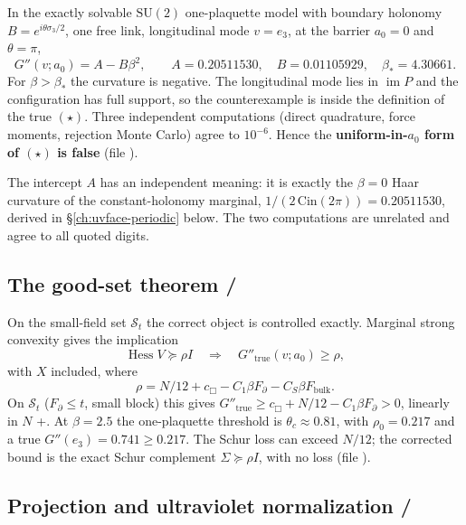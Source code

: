 In the exactly solvable $\mathrm{SU}(2)$ one-plaquette model with boundary holonomy
$B=e^{i\theta\sigma_3/2}$, one free link, longitudinal mode $v=e_3$, at the barrier $a_0=0$ and
$\theta=\pi$,
\begin{equation}
  G''(v;a_0)=A-B\beta^2,\qquad A=0.20511530,\quad B=0.01105929,\quad \beta_*=4.30661 .
  \label{eq:v3counter}
\end{equation}
For $\beta>\beta_*$ the curvature is negative. The longitudinal mode lies in $\operatorname{im}P$ and
the configuration has full support, so the counterexample is inside the definition of the true
$(\star)$. Three independent computations (direct quadrature, force moments, rejection Monte Carlo)
agree to $10^{-6}$. Hence the \textbf{uniform-in-$a_0$ form of $(\star)$ is false} \LN{} (file
).

The intercept $A$ has an independent meaning: it is exactly the $\beta=0$ Haar curvature of the
constant-holonomy marginal, $1/(2\,\mathrm{Cin}(2\pi))=0.20511530$, derived in
\S\ref{ch:uvface-periodic} below. The two computations are unrelated and agree to all quoted digits.

\subsection{The good-set theorem \LT/\LC}

On the small-field set $\mathcal S_t$ the correct object is controlled exactly. Marginal strong
convexity gives the implication
\begin{equation}
  \operatorname{Hess}V\succeq\rho I\quad\Longrightarrow\quad G''_{\mathrm{true}}(v;a_0)\ge\rho,
  \label{eq:v3good}
\end{equation}
with $X$ included, where
\begin{equation}
  \rho=N/12+c_\Box-C_1\beta F_\partial-C_S\beta F_{\mathrm{bulk}} .
  \label{eq:v3modulus}
\end{equation}
On $\mathcal S_t$ ($F_\partial\le t$, small block) this gives
$G''_{\mathrm{true}}\ge c_\Box+N/12-C_1\beta F_\partial>0$, linearly in $N$ \LC{}+\LE. At
$\beta=2.5$ the one-plaquette threshold is $\theta_c\approx0.81$, with $\rho_0=0.217$ and a true
$G''(e_3)=0.741\ge0.217$. The Schur loss can exceed $N/12$; the corrected bound is the exact Schur
complement $\Sigma\succeq\rho I$, with no loss (file ).

\subsection{Projection and ultraviolet normalization \LT/\LC}

